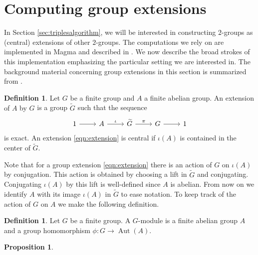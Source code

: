 \documentclass{dcthesis}
\newcommand{\defi}[1]{\textsf{#1}}
\newcommand{\wt}[1]{\widetilde{#1}}
\DeclareMathOperator{\Aut}{Aut}
\numberwithin{equation}{section}
\newtheorem{prop}[equation]{Proposition}
\theoremstyle{definition}
\newtheorem{definition}[equation]{Definition}
\theoremstyle{remark}
\begin{document}
{{  \section{Computing group extensions}{\label{sec:modcoho}
    In Section \ref{sec:triplesalgorithm},
    we will be interested in constructing
    $2$-groups
    as (central) extensions of other $2$-groups.
    The computations we rely on are implemented in
    \textsf{Magma}
    and described in
    \cite{magmabook}.
    We now describe the broad strokes of
    this implementation
    emphasizing the particular
    setting we are interested in.
    The background material concerning group
    extensions in this section is summarized
    from
    \cite[\S 17.4]{DF}.
    \begin{definition}
      \label{def:groupextension}
      Let $G$ be a finite group
      and $A$ a finite abelian group.
      An \defi{extension of $A$ by $G$} is
      a group $\wt{G}$ such that the sequence
      \begin{equation}
        \label{eqn:extension}
        \begin{tikzcd}
          1\arrow{r}&A\arrow{r}{\iota}&\wt{G}\arrow{r}{\pi}&G\arrow{r}&1
        \end{tikzcd}
      \end{equation}
      is exact.
      An extension \eqref{eqn:extension}
      is \defi{central}
      if $\iota(A)$ is
      contained in the center of $\wt{G}$.
    \end{definition}
    Note that for a group extension
    \eqref{eqn:extension}
    there is an action of $G$ on
    $\iota(A)$ by conjugation.
    This action is obtained by choosing
    a lift in $\wt{G}$ and conjugating.
    Conjugating $\iota(A)$ by
    this lift is well-defined
    since $A$ is abelian.
    From now on we identify $A$ with
    its image $\iota(A)$ in $\wt{G}$
    to ease notation.
    To keep track of the action of $G$
    on $A$ we make the
    following definition.
    \begin{definition}
      \label{def:Gmodule}
      Let $G$ be a finite group.
      A \defi{$G$-module}
      is a finite abelian group $A$
      and a group homomorphism
      $\phi\colon G\to\Aut(A)$.
    \end{definition}
    \begin{prop}
      \label{prop:centralextensionstrivialGaction}

\end{prop}}}}
\end{document}
